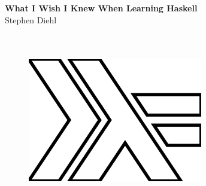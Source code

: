 \begin{titlepage}
  \pagecolor{white}

  \begin{center}
     \Huge\textbf{What I Wish I Knew When Learning Haskell}\\
     \Large{Stephen Diehl}
  \end{center}

  \begin{figure}
      \centering
      \includegraphics[height=3in,width=3in]{img/cover.ps}
  \end{figure}

\end{titlepage}
\pagecolor{white}
